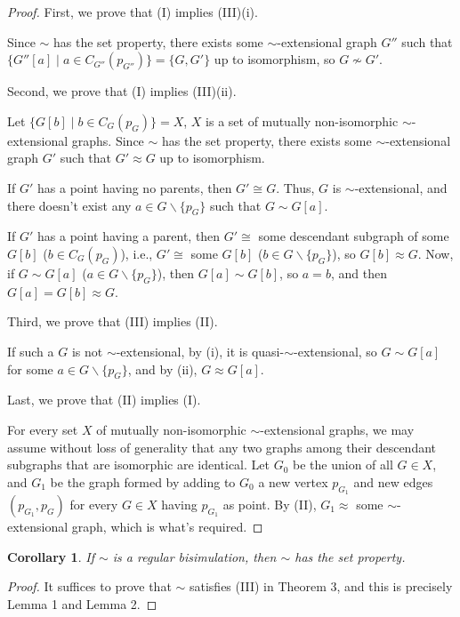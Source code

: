 \documentclass{amsart}
\newtheorem{corollary}{Corollary}
\begin{document}
\begin{proof}
    First, we prove that (I) implies (III)(i).

    Since $\sim$ has the set property, there exists some $\sim$-extensional graph $G''$ such that $\{G''[a]\mid a\in C_{G''}(p_{G''})\}=\{G,G'\}$ up to isomorphism, so $G\not\sim G'$.

    Second, we prove that (I) implies (III)(ii).

    Let $\{G[b]\mid b\in C_G(p_G)\}=X$, $X$ is a set of mutually non-isomorphic $\sim$-extensional graphs. Since $\sim$ has the set property, there exists some $\sim$-extensional graph $G'$ such that $G'\approx G$ up to isomorphism.
    
    If $G'$ has a point having no parents, then $G'\cong G$. Thus, $G$ is $\sim$-extensional, and there doesn't exist any $a\in G\backslash\{p_G\}$ such that $G\sim G[a]$.
    
    If $G'$ has a point having a parent, then $G'\cong$ some descendant subgraph of some $G[b]$ ($b\in C_G(p_G)$), i.e., $G'\cong$ some $G[b]$ ($b\in G\backslash\{p_G\}$), so $G[b]\approx G$. Now, if $G\sim G[a]$ ($a\in G\backslash\{p_G\}$), then $G[a]\sim G[b]$, so $a=b$, and then $G[a]=G[b]\approx G$.

    Third, we prove that (III) implies (II).

    If such a $G$ is not $\sim$-extensional, by (i), it is quasi-$\sim$-extensional, so $G\sim G[a]$ for some $a\in G\backslash\{p_G\}$, and by (ii), $G\approx G[a]$.

    Last, we prove that (II) implies (I).

    For every set $X$ of mutually non-isomorphic $\sim$-extensional graphs, we may assume without loss of generality that any two graphs among their descendant subgraphs that are isomorphic are identical.
    Let $G_0$ be the union of all $G \in X$, and $G_1$ be the graph formed by adding to $G_0$ a new vertex $p_{G_1}$ and new edges $(p_{G_1}, p_G)$ for every $G \in X$ having $p_{G_1}$ as point.
    By (II), $G_1\approx $ some $\sim$-extensional graph, which is what's required.
\end{proof}

\begin{corollary}
    If $\sim$ is a regular bisimulation, then $\sim$ has the set property.
\end{corollary}
\begin{proof}
    It suffices to prove that $\sim$ satisfies (III) in Theorem 3, and this is precisely Lemma 1 and Lemma 2.
\end{proof}
\end{document}
